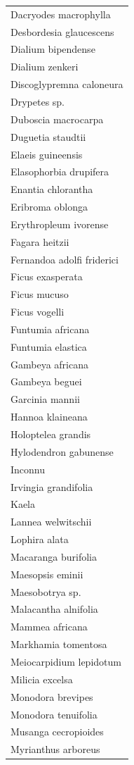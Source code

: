 \documentclass[
  12pt,
  a4paper,
  extrafontsizes,
  onecolumn,
  openright]{book}
\theoremstyle{definition}
\theoremstyle{definition}
\theoremstyle{definition}
\theoremstyle{definition}
\theoremstyle{remark}
\begin{document}
\begin{longtable}[]{@{}l@{}}
Dacryodes macrophylla \\
Desbordesia glaucescens \\
Dialium bipendense \\
Dialium zenkeri \\
Discoglypremna caloneura \\
Drypetes sp. \\
Duboscia macrocarpa \\
Duguetia staudtii \\
Elaeis guineensis \\
Elasophorbia drupifera \\
Enantia chlorantha \\
Eribroma oblonga \\
Erythropleum ivorense \\
Fagara heitzii \\
Fernandoa adolfi friderici \\
Ficus exasperata \\
Ficus mucuso \\
Ficus vogelli \\
Funtumia africana \\
Funtumia elastica \\
Gambeya africana \\
Gambeya beguei \\
Garcinia mannii \\
Hannoa klaineana \\
Holoptelea grandis \\
Hylodendron gabunense \\
Inconnu \\
Irvingia grandifolia \\
Kaela \\
Lannea welwitschii \\
Lophira alata \\
Macaranga burifolia \\
Maesopsis eminii \\
Maesobotrya sp. \\
Malacantha alnifolia \\
Mammea africana \\
Markhamia tomentosa \\
Meiocarpidium lepidotum \\
Milicia excelsa \\
Monodora brevipes \\
Monodora tenuifolia \\
Musanga cecropioides \\
Myrianthus arboreus \\

\end{longtable}
\end{document}
